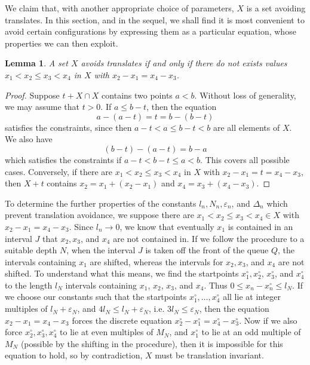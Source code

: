 \documentclass{report}
\theoremstyle{plain}
\newtheorem{lemma}{Lemma}
\theoremstyle{plain}
\begin{document}
We claim that, with another appropriate choice of parameters, $X$ is a set avoiding translates. In this section, and in the sequel, we shall find it is most convenient to avoid certain configurations by expressing them as a particular equation, whose properties we can then exploit.

\begin{lemma}
    A set $X$ avoids translates if and only if there do not exists values $x_1 < x_2 \leq x_3 < x_4$ in $X$ with $x_2 - x_1 = x_4 - x_3$.
\end{lemma}
\begin{proof}

    Suppose $t + X \cap X$ contains two points $a < b$. Without loss of generality, we may assume that $t > 0$. If $a \leq b - t$, then the equation
    \[ a - (a - t) = t = b - (b - t) \]
    satisfies the constraints, since then $a - t < a \leq b - t < b$ are all elements of $X$. We also have
    \[ (b - t) - (a - t) = b - a \]
    which satisfies the constraints if $a - t < b - t \leq a < b$. This covers all possible cases. Conversely, if there are $x_1 < x_2 \leq x_3 < x_4$ in $X$ with $x_2 - x_1 = t = x_4 - x_3$, then $X + t$ contains $x_2 = x_1 + (x_2 - x_1)$ and $x_4 = x_3 + (x_4 - x_3)$.
\end{proof}

To determine the further properties of the constants $l_n, N_n, \varepsilon_n$, and $\Delta_n$ which prevent translation avoidance, we suppose there are $x_1 < x_2 \leq x_3 < x_4 \in X$ with $x_2 - x_1 = x_4 - x_3$. Since $l_n \to 0$, we know that eventually $x_1$ is contained in an interval $J$ that $x_2,x_3$, and $x_4$ are not contained in. If we follow the procedure to a suitable depth $N$, when the interval $J$ is taken off the front of the queue $Q$, the intervals containing $x_1$ are shifted, whereas the intervals for $x_2,x_3$, and $x_4$ are not shifted. To understand what this means, we find the startpoints $x_1^\circ, x_2^\circ$, $x_3^\circ$, and $x_4^\circ$ to the length $l_N$ intervals containing $x_1$, $x_2$, $x_3$, and $x_4$. Thus $0 \leq x_n - x_n^\circ \leq l_N$. If we choose our constants such that the startpoints $x_1^\circ, \dots, x_4^\circ$ all lie at integer multiples of $l_N + \varepsilon_N$, and $4l_N \leq l_N + \varepsilon_N$, i.e. $3l_N \leq \varepsilon_N$, then the equation $x_2 - x_1 = x_4 - x_3$ forces the discrete equation $x_2^\circ - x_1^\circ = x_4^\circ - x_3^\circ$. Now if we also force $x_2^\circ, x_3^\circ, x_4^\circ$ to lie at even multiples of $M_N$, and $x_1^\circ$ to lie at an odd multiple of $M_N$ (possible by the shifting in the procedure), then it is impossible for this equation to hold, so by contradiction, $X$ must be translation invariant.
\end{document}
